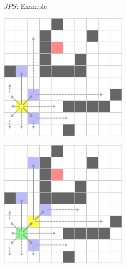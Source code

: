 \documentclass{presentation}
\begin{document}
\begin{frame}{$JPS$: Example}
	\begin{minipage}{0.23\textwidth}
		\includegraphics[width=\textwidth]{figures/jps_geschnitten/1.png}
	\end{minipage}%
	\hfill%
	\begin{minipage}{0.23\textwidth}
		\includegraphics[width=\textwidth]{figures/jps_geschnitten/2.png}

\end{minipage}
\end{frame}
\end{document}
